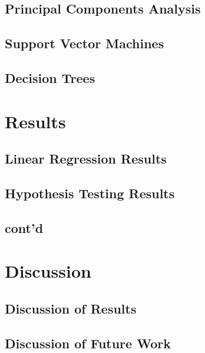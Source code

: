 \documentclass[11pt]{article}
\begin{document}
	\subsection{Principal Components Analysis}
	
		
		
	\subsection{Support Vector Machines}
	
		
		
	\subsection{Decision Trees}
	
		

		
\section{Results}
		
	\subsection{Linear Regression Results}
	
		
		
		
	\subsection{Hypothesis Testing Results}
	
		
		
	\subsection{cont'd}
	
		
		
\section{Discussion}
	
	\subsection{Discussion of Results}
		
		
		
	\subsection{Discussion of Future Work}
	
		
		

\end{document}
